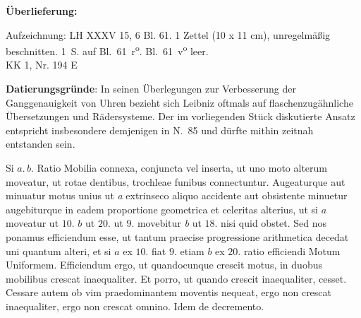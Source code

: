 \begin{ledgroupsized}[r]{120mm}
\footnotesize
\pstart
\noindent\textbf{\"{U}berlieferung:}
\pend
\end{ledgroupsized}

\begin{ledgroupsized}[r]{114mm}
\footnotesize
\pstart \parindent -6mm
Aufzeichnung: LH XXXV 15, 6 Bl. 61.
1 Zettel (10 x 11 cm), unregelm\"{a}{\ss}ig beschnitten.
1~S. auf Bl.~61~r\textsuperscript{o}. Bl.~61~v\textsuperscript{o} leer.%
\\KK 1, Nr. 194 E
\pend
\end{ledgroupsized}
\vspace*{5mm}

\begin{ledgroup}
\footnotesize
\pstart
\noindent\footnotesize{\textbf{Datierungsgr\"{u}nde}: In seinen \"{U}berlegungen zur Verbesserung der Ganggenauigkeit von Uhren
bezieht sich Leibniz oftmals auf flaschenzug\"{a}hnliche \"{U}bersetzungen und R\"{a}dersysteme.
Der im vorliegenden Stück diskutierte Ansatz entspricht insbesondere demjenigen in N.~85
und dürfte mithin zeitnah entstanden sein.}
\pend
\end{ledgroup}
            
\vspace*{8mm}
\pstart 
\normalsize \noindent
[61~r\textsuperscript{o}] Si  $a.\,b.$ Ratio
 Mobilia  connexa, conjuncta vel inserta, ut uno moto alterum moveatur, ut rotae dentibus, trochleae\protect{} funibus connectuntur. Augeaturque  aut minuatur motus unius ut \textit{a} extrinseco aliquo accidente aut obsistente minuetur augebiturque in eadem proportione  geometrica et celeritas\protect{} alterius, ut si $a$ moveatur ut $10.$ $b$ ut $20.$
 ut $9.$ movebitur \textit{b} ut $18.$ nisi quid obstet. Sed nos ponamus efficiendum esse, ut tantum praecise progressione arithmetica\protect{} decedat uni quantum alteri, et si $a$ ex $10.$ fiat $9.$ etiam $b$ ex $20.$  ratio efficiendi Motum Uniformem\protect{}. Efficiendum ergo, ut quandocunque crescit motus, in duobus mobilibus crescat  inaequaliter. Et porro, ut quando crescit inaequaliter, cesset. Cessare autem ob vim praedominantem moventis nequeat, ergo non crescat inaequaliter, ergo non crescat omnino. Idem de decremento. 
\pend 
 


